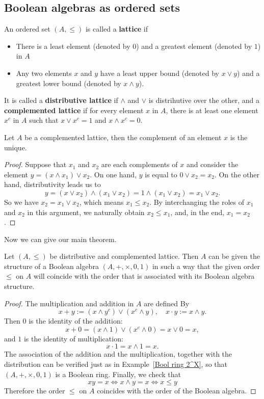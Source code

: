 \subsection{Boolean algebras as ordered sets}
\begin{definition}
An ordered set $(A,\leq)$ is called a \textbf{lattice} if 
\begin{itemize}
\item There is a least element (denoted by $0$)  and a greatest element (denoted by $1$) in $A$
\item Any two elements $x$ and $y$ have a least upper bound (denoted by $x\vee y$) and a greatest lower bound (denoted by $x\wedge y$).
\end{itemize}
It is called a \textbf{distributive lattice} if $\wedge$ and $\vee$ is distrihutive over the other, and a \textbf{complemented lattice} if for every element $x$ in $A$, 
there is at least one element $x^c$ in $A$ such that $x\vee x^c=1$ and $x\wedge x^c=0$.
\end{definition}
\begin{lemma}
Let $A$ be a complemented lattice, then the complement of an element $x$ is the unique.
\end{lemma}
\begin{proof}
Suppose that $x_1$ and $x_2$ are each complements of $x$ and consider the element $y=(x\wedge x_1)\vee x_2$. On one hand, $y$ is equal to $0\vee x_2=x_2$. 
On the other hand, distributivity leads us to
\[y=(x\vee x_2)\wedge(x_1\vee x_2)=1\wedge(x_1\vee x_2)=x_1\vee x_2.\]
So we have $x_2=x_1\vee x_2$, which means $x_1\leq x_2$. By interchanging the roles of $x_1$ and $x_2$ in this argument, we naturally obtain $x_2\leq x_1$, 
and, in the end, $x_1=x_2$.
\end{proof}
Now we can give our main theorem.
\begin{theorem}\label{Bool ring lattice}
Let $(A,\leq)$ be distributive and complemented lattice. Then $A$ can be given the structure of a Boolean algebra $(A,+,\times,0,1)$ in such a way that the 
given order $\leq$ on $A$ will coincide with the order that is associated with its Boolean algebra structure.
\end{theorem}
\begin{proof}
The multiplication and addition in $A$ are defined By
\[x+y:=(x\wedge y^c)\vee(x^c\wedge y),\quad x\cdot y:=x\wedge y.\]
Then $0$ is the identity of the addition:
\[x+0=(x\wedge 1)\vee(x^c\wedge 0)=x\vee 0=x,\]
and $1$ is the identity of multiplication:
\[x\cdot 1=x\wedge 1=x.\]
The association of the addition and the multiplication, together with the distribution can be verified just as in 
Example~\ref{Bool ring 2^X}, so that $(A,+,\times,0,1)$ is a Boolean ring. Finally, we check that
\[xy=x\iff x\wedge y=x\iff x\leq y\]
Therefore the order $\leq$ on $A$ coincides with the order of the Boolean algebra.
\end{proof}
